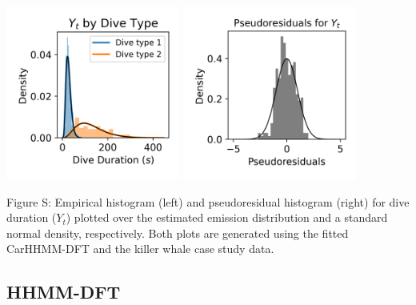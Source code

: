\documentclass{article}
\begin{document}
        \begin{center}
        \includegraphics[width=2.25in]{../Plots/2019/20190902-182840-CATs_OB_1_0_267_CarHHMM2_empirical_hist_dive_duration.png}
        \includegraphics[width=2.25in]{../Plots/2019/20190902-182840-CATs_OB_1_0_267_CarHHMM2_pseudresids_Dive_Duration.png}
        \end{center}
        
        \noindent Figure S: Empirical histogram (left) and pseudoresidual histogram (right) for dive duration ($Y_{t}$) plotted over the estimated emission distribution and a standard normal density, respectively. Both plots are generated using the fitted CarHHMM-DFT and the killer whale case study data.
        \addtocounter{fignum}{1}
        
        \subsection{HHMM-DFT}
        
\end{document}
